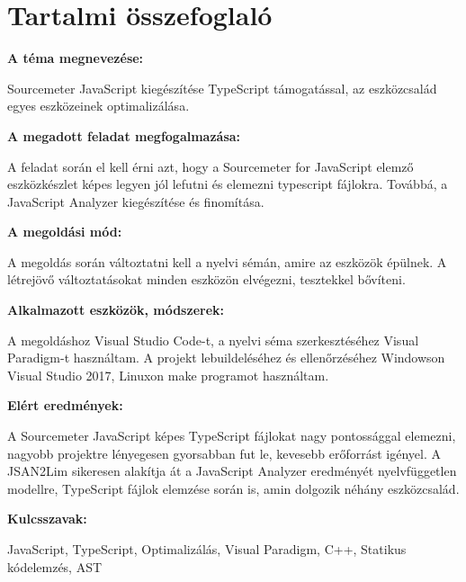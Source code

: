 \chapter*{Tartalmi összefoglaló}

\noindent\textbf{A téma megnevezése:}

Sourcemeter JavaScript kiegészítése TypeScript támogatással, az eszközcsalád egyes eszközeinek optimalizálása.

\noindent\textbf{A megadott feladat megfogalmazása:}

A feladat során el kell érni azt, hogy a Sourcemeter for JavaScript elemző eszközkészlet képes legyen jól lefutni és elemezni typescript fájlokra.
Továbbá, a JavaScript Analyzer kiegészítése és finomítása.

\noindent\textbf{A megoldási mód:}

A megoldás során változtatni kell a nyelvi sémán, amire az eszközök épülnek. A létrejövő változtatásokat minden eszközön elvégezni, tesztekkel bővíteni.

\noindent\textbf{Alkalmazott eszközök, módszerek:}

A megoldáshoz Visual Studio Code-t, a nyelvi séma szerkesztéséhez Visual Paradigm-t használtam.
A projekt lebuildeléséhez és ellenőrzéséhez Windowson Visual Studio 2017, Linuxon make programot használtam.

\noindent\textbf{Elért eredmények:}

A Sourcemeter JavaScript képes TypeScript fájlokat nagy pontossággal elemezni, nagyobb projektre lényegesen gyorsabban fut le, kevesebb erőforrást igényel.
A JSAN2Lim sikeresen alakítja át a JavaScript Analyzer eredményét nyelvfüggetlen modellre, TypeScript fájlok elemzése során is, amin dolgozik néhány eszközcsalád.

\noindent\textbf{Kulcsszavak:}

JavaScript, TypeScript, Optimalizálás, Visual Paradigm, C++, Statikus kódelemzés, AST
